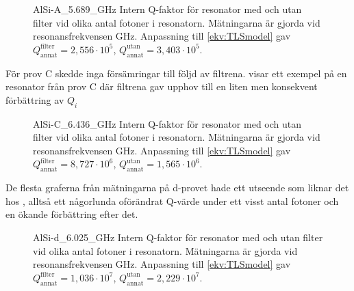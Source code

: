 \documentclass[main.tex]{subfiles}
\begin{document}
\begin{figure}[H]
  \centering
  \setlength{}
  \setlength\figureheight{15em}
  
  \caption{AlSi-A\_5.689\_GHz Intern Q-faktor för resonator med och utan filter vid olika antal fotoner i resonatorn. Mätningarna är gjorda vid resonansfrekvensen \unit[4,953]{GHz}. Anpassning till \ref{ekv:TLSmodel} gav  $Q_{\text{annat}}^{\text{filter}}=2,556\cdot10^5$, $Q_{\text{annat}}^{\text{utan}}=3,403\cdot10^5$.}
  \label{fig:A5.689}
\end{figure}


För prov C skedde inga försämringar till följd av filtrena.  visar ett exempel på en resonator från prov C där filtrena gav upphov till en liten men konsekvent förbättring av $Q_i$

\begin{figure}[H]
  \centering
  \setlength{}
  \setlength\figureheight{15em}
  
  \caption{AlSi-C\_6.436\_GHz Intern Q-faktor för resonator med och utan filter vid olika antal fotoner i resonatorn. Mätningarna är gjorda vid resonansfrekvensen \unit[4,953]{GHz}. Anpassning till \ref{ekv:TLSmodel} gav $Q_{\text{annat}}^{\text{filter}}=8,727\cdot10^6$, $Q_{\text{annat}}^{\text{utan}}=1,565\cdot10^6$.}
  \label{fig:C6.436}
\end{figure}

De flesta graferna från mätningarna på d-provet hade ett utseende som liknar det hos , alltså ett någorlunda oförändrat Q-värde under ett visst antal fotoner och en ökande förbättring efter det.

\begin{figure}[H]
  \centering
  \setlength{}
  \setlength\figureheight{15em}
  
  \caption{AlSi-d\_6.025\_GHz Intern Q-faktor för resonator med och utan filter vid olika antal fotoner i resonatorn. Mätningarna är gjorda vid resonansfrekvensen \unit[6,025]{GHz}. Anpassning till \ref{ekv:TLSmodel} gav $Q_{\text{annat}}^{\text{filter}}=1,036\cdot10^7$, $Q_{\text{annat}}^{\text{utan}}=2,229\cdot10^7$.}
  \label{fig:d6.025}
\end{figure}
\end{document}
